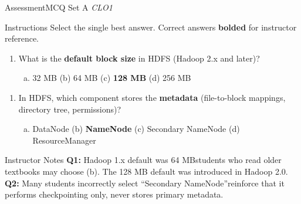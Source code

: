 \documentclass[aspectratio=169,10pt]{beamer}
\begin{document}
\begin{frame}{Assessment\textemdash MCQ Set A \hfill\small\textit{CLO1}}
  \begin{exampleblock}{Instructions}
    Select the single best answer.  Correct answers \textbf{bolded} for instructor reference.
  \end{exampleblock}
  \vspace{8pt}
  \begin{enumerate}[\textbf{Q1.}]
    \item What is the \textbf{default block size} in HDFS (Hadoop 2.x and later)?
    \begin{enumerate}[(a)]
      \item 32 MB \quad (b) 64 MB \quad (c) \textbf{128 MB} \quad (d) 256 MB
    \end{enumerate}
  \end{enumerate}
  \vspace{8pt}
  \begin{enumerate}[\textbf{Q2.}]
    \item In HDFS, which component stores the \textbf{metadata} (file-to-block mappings, directory tree, permissions)?
    \begin{enumerate}[(a)]
      \item DataNode \quad (b) \textbf{NameNode} \quad (c) Secondary NameNode \quad (d) ResourceManager
    \end{enumerate}
  \end{enumerate}
  \vspace{8pt}
  \begin{alertblock}{Instructor Notes}
    \textbf{Q1:} Hadoop 1.x default was 64 MB\textemdash students who read older textbooks may choose (b).  The 128 MB default was introduced in Hadoop 2.0.  \textbf{Q2:} Many students incorrectly select ``Secondary NameNode''\textemdash reinforce that it performs checkpointing only, never stores primary metadata.
  \end{alertblock}
\end{frame}
\end{document}
